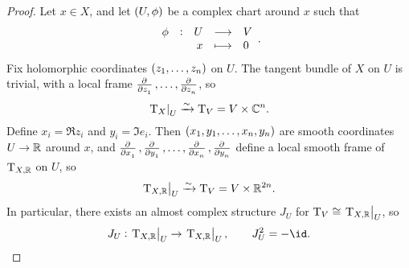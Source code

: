 \begin{proof}
Let $ x \in X $, and let $ \br{U, \phi} $ be a complex chart around $ x $ such that
$$ \function[\phi]{U}{V}{x}{0}. $$
Fix holomorphic coordinates $ \br{z_1, \dots, z_n} $ on $ U $. The tangent bundle of $ X $ on $ U $ is trivial, with a local frame $ \tpd{}{z_1}, \dots, \tpd{}{z_n} $, so
$$ \left. \mathrm{T}_X \right|_U \xrightarrow{\sim} \mathrm{T}_V = V \times \mathbb{C}^n. $$
Define $ x_i = \Re z_i $ and $ y_i = \Im e_i $. Then $ \br{x_1, y_1, \dots, x_n, y_n} $ are smooth coordinates $ U \to \mathbb{R} $ around $ x $, and $ \tpd{}{x_1}, \tpd{}{y_1}, \dots, \tpd{}{x_n}, \tpd{}{y_n} $ define a local smooth frame of $ \mathrm{T}_{X, \mathbb{R}} $ on $ U $, so
$$ \left. \mathrm{T}_{X, \mathbb{R}} \right|_U \xrightarrow{\sim} \mathrm{T}_V = V \times \mathbb{R}^{2n}. $$
In particular, there exists an almost complex structure $ J_U $ for $ \mathrm{T}_V \cong \left. \mathrm{T}_{X, \mathbb{R}} \right|_U $, so
$$ J_U : \eval{\T_{X, \RR}}_U \to \eval{\T_{X, \RR}}_U, \qquad J_U^2 = -\id. $$

\pagebreak


\end{proof}
